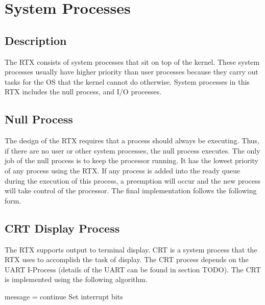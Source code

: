 \documentclass[12pt]{report}
\begin{document}
\section{System Processes}
\subsection{Description}
The RTX consists of system processes that sit on top of the kernel. These system processes usually have higher priority than user processes because they carry out tasks for the OS that the kernel cannot do otherwise. System processes in this RTX includes the null process, and I/O processes.

\subsection{Null Process}
The design of the RTX requires that a process should always be executing. Thus, if there are no user or other system processes, the null process executes. The only job of the null process is to keep the processor running. It has the lowest priority of any process using the RTX. If any process is added into the ready queue during the execution of this process, a preemption will occur and the new process will take control of the processor. The final implementation follows the following form.

 \begin{algorithmic}
    \EndWhile
  \EndFunction
 \end{algorithmic}

\subsection{CRT Display Process}
\label{sec:crt_process}
The RTX supports output to terminal display. CRT is a system process that the RTX uses to accomplish the task of display. The CRT process depends on the UART I-Process (details of the UART can be found in section TODO). The CRT is implemented using the following algorithm.

\begin{algorithmic}
        \State message = 
            \State continue
        \EndIf
        \State {}
        \State Set interrupt bits
    \EndWhile
  \EndFunction
 \end{algorithmic}
\end{document}
